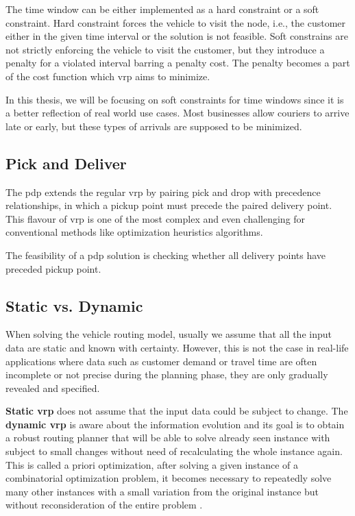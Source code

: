     The time window can be either implemented as a hard constraint or a soft constraint. Hard constraint forces the vehicle to visit the node, i.e., the customer either in the given time interval or the solution is not feasible. Soft constrains are not strictly enforcing the vehicle to visit the customer, but they introduce a penalty for a violated interval barring a penalty cost. The penalty becomes a part of the cost function which \gls{vrp} aims to minimize.
    
    In this thesis, we will be focusing on soft constraints for time windows since it is a better reflection of real world use cases. Most businesses allow couriers to arrive late or early, but these types of arrivals are supposed to be minimized.
    
    \subsection{Pick and Deliver}
    The \gls{pdp} extends the regular \gls{vrp} by pairing pick and drop with precedence relationships, in which a pickup point must precede the paired delivery point. This flavour of \gls{vrp} is one of the most complex and even challenging for conventional methods like optimization heuristics algorithms.
    
    The feasibility of a \gls{pdp} solution is checking whether all delivery points have preceded pickup point.
    
    \subsection{Static vs. Dynamic}\label{dynamic}
    When solving the vehicle routing model, usually we assume that all the input data are static and known with certainty. However, this is not the case in real-life applications where data such as customer demand or travel time are often incomplete or not precise during the planning phase, they are only gradually revealed and specified.
    
    \textbf{Static \gls{vrp}} does not assume that the input data could be subject to change. The \textbf{dynamic \gls{vrp}} is aware about the information evolution\cite{psaraftis} and its goal is to obtain a robust routing planner that will be able to solve already seen instance with subject to small changes without need of recalculating the whole instance again. This is called a priori optimization, after solving a given instance of a combinatorial optimization problem, it becomes necessary to repeatedly solve many other instances with a small variation from the original instance but without reconsideration of the entire problem \cite{apriori-optimization}.
    
